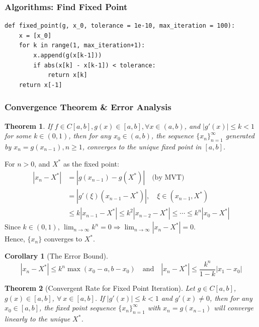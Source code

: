 \documentclass[12pt, a4paper]{article}
\makeatletter
\theoremstyle{break}
\newtheorem{theorem}{Theorem}[section]
\newtheorem{corollary}{Corollary}[theorem]
\renewenvironment{proof}[1][\proofname]{\par
  \pushQED{\qed}%
  \normalfont \topsep6\p@\@plus6\p@\relax
  \trivlist
  \item[\hskip\labelsep\bfseries #1\@addpunct{.}]\mbox{}\newline\ignorespaces
}{%
  \popQED\endtrivlist\@endpefalse
}
\makeatother
\begin{document}
\subsubsection{Algorithms: Find Fixed Point}
\begin{lstlisting}
def fixed_point(g, x_0, tolerance = 1e-10, max_iteration = 100):
    x = [x_0]
    for k in range(1, max_iteration+1):
        x.append(g(x[k-1]))
        if abs(x[k] - x[k-1]) < tolerance:
            return x[k]
    return x[-1]
\end{lstlisting}

\subsubsection{Convergence Theorem \& Error Analysis}

\begin{theorem}
If $f \in C[a ,b], g(x) \in [a ,b], \forall x \in (a ,b)$, and $|g'(x)| \le k < 1$ for some $k \in (0,1)$, then for any $x_0 \in (a ,b)$, the sequence $\{x_n\}_{n = 1}^{\infty}$ generated by $x_n = g(x_{n-1}), n \ge 1$, converges to the unique fixed point in $[a,b]$.
\end{theorem}

\begin{proof}
For $n > 0$, and $X^*$ as the fixed point:
\begin{align*}
|x_n - X^*| &= |g(x_{n-1}) - g(X^*)| \quad \text{(by MVT)} \\
&= |g'(\xi) (x_{n-1} - X^*)|, \quad \xi \in (x_{n-1} ,X^*) \\
&\le k|x_{n-1} - X^*| \le k^2|x_{n-2} - X^*| \le \cdots \le k^n|x_0 - X^*|
\end{align*}
Since $k \in (0,1)$, $\lim_{n \rightarrow \infty} k^n = 0 \Rightarrow \lim_{n \rightarrow \infty} |x_n - X^*|=0$.
\\
Hence, $\{x_n\}$ converges to $X^*$.
\end{proof}

\begin{corollary}[The Error Bound]
\[ |x_n-X^*| \le k^n \max(x_0-a, b-x_0) \quad \text{and} \quad |x_n - X^*| \le \frac{k^n}{1-k} |x_1 - x_0| \]
\end{corollary}

\begin{theorem}[Convergent Rate for Fixed Point Iteration]
Let $g \in C[a ,b]$, $g(x) \in [a, b]$, $\forall \ x \in [a ,b]$.
If $|g'(x)| \le k < 1$ and $g'(x) \neq 0$, then for any $x_0 \in [a ,b]$, the fixed point sequence $\{x_n\}_{n=1}^{\infty}$ with $x_n = g(x_{n-1})$ will converge linearly to the unique $X^*$.
\end{theorem}
\end{document}
